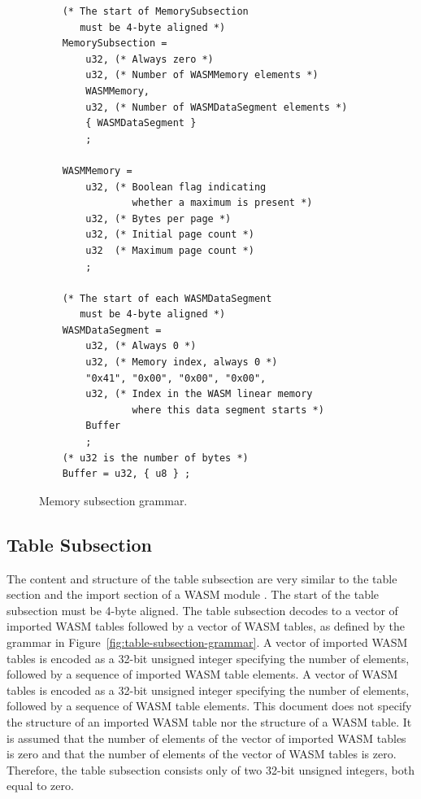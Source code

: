 \documentclass{article}
\begin{document}
\begin{figure}[H]
\begin{verbatim}
    (* The start of MemorySubsection
       must be 4-byte aligned *)
    MemorySubsection =
        u32, (* Always zero *)
        u32, (* Number of WASMMemory elements *)
        WASMMemory,
        u32, (* Number of WASMDataSegment elements *)
        { WASMDataSegment }
        ;

    WASMMemory =
        u32, (* Boolean flag indicating
                whether a maximum is present *)
        u32, (* Bytes per page *)
        u32, (* Initial page count *)
        u32  (* Maximum page count *)
        ;

    (* The start of each WASMDataSegment
       must be 4-byte aligned *)
    WASMDataSegment =
        u32, (* Always 0 *)
        u32, (* Memory index, always 0 *)
        "0x41", "0x00", "0x00", "0x00",
        u32, (* Index in the WASM linear memory
                where this data segment starts *)
        Buffer
        ;
    (* u32 is the number of bytes *)
    Buffer = u32, { u8 } ;
\end{verbatim}
\caption{Memory subsection grammar.}
\label{fig:memory-subsection-grammar}
\end{figure}

\subsection{Table Subsection}

The content and structure of the table subsection are very similar to the table section and the import section of a WASM module \cite[Secs.~5.5.7 and 5.5.5]{webassembly2019core}.
The start of the table subsection must be 4-byte aligned.
The table subsection decodes to a vector of imported WASM tables followed by a vector of WASM tables, as defined by the grammar in Figure~\ref{fig:table-subsection-grammar}.
A vector of imported WASM tables is encoded as a 32-bit unsigned integer specifying the
number of elements, followed by a sequence of imported WASM table elements.
A vector of WASM tables is encoded as a 32-bit unsigned integer specifying the number of elements, followed by a sequence of WASM table elements.
This document does not specify the structure of an imported WASM table nor the structure of a WASM table.
It is assumed that the number of elements of the vector of imported WASM tables is zero and that the number of elements of the vector of WASM tables is zero.
Therefore, the table subsection consists only of two 32-bit unsigned integers, both equal to zero.
\end{document}
